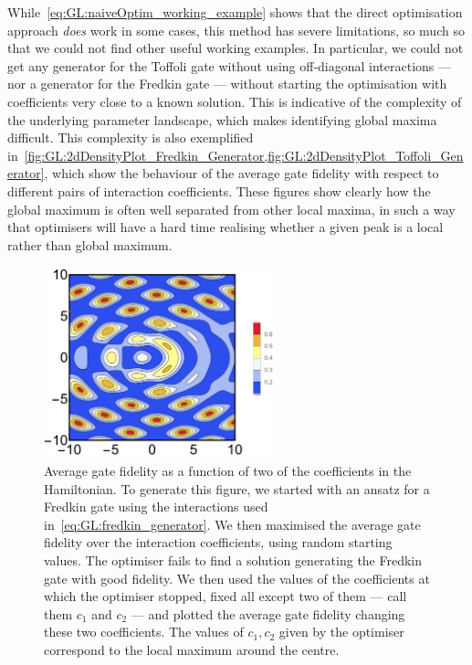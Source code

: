 While~\cref{eq:GL:naiveOptim_working_example} shows that the direct optimisation approach \emph{does} work in some cases, this method has severe limitations, so much so that we could not find other useful working examples. In particular, we could not get any generator for the Toffoli gate without using off-diagonal interactions --- nor a generator for the Fredkin gate --- without starting the optimisation with coefficients very close to a known solution.
This is indicative of the complexity of the underlying parameter landscape, which makes identifying global maxima difficult.
This complexity is also exemplified in~\cref{fig:GL:2dDensityPlot_Fredkin_Generator,fig:GL:2dDensityPlot_Toffoli_Generator}, which show the behaviour of the average gate fidelity with respect to different pairs of interaction coefficients. These figures show clearly how the global maximum is often well separated from other local maxima, in such a way that optimisers will have a hard time realising whether a given peak is a local rather than global maximum.

\begin{figure}[tb]
    \centering
    \includegraphics[width=0.6\textwidth]{Figures/gate-learning/GL_2dDensityPlot_Fredkin_Generator.png}
    \caption{
        Average gate fidelity as a function of two of the coefficients in the Hamiltonian.
        To generate this figure, we started with an ansatz for a Fredkin gate using the interactions used in~\cref{eq:GL:fredkin_generator}. We then maximised the average gate fidelity over the interaction coefficients, using random starting values. The optimiser fails to find a solution generating the Fredkin gate with good fidelity. We then used the values of the coefficients at which the optimiser stopped, fixed all except two of them --- call them $c_1$ and $c_2$ --- and plotted the average gate fidelity changing these two coefficients.
        The values of $c_1,c_2$ given by the optimiser correspond to the local maximum around the centre.
    }
    \label{fig:GL:2dDensityPlot_Fredkin_Generator}
\end{figure}

